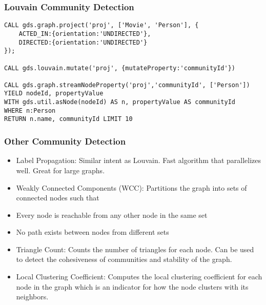 \begin{frame}[fragile]\frametitle{Louvain Community Detection}

\begin{lstlisting}
CALL gds.graph.project('proj', ['Movie', 'Person'], {
    ACTED_IN:{orientation:'UNDIRECTED'},
    DIRECTED:{orientation:'UNDIRECTED'}
});

CALL gds.louvain.mutate('proj', {mutateProperty:'communityId'})

CALL gds.graph.streamNodeProperty('proj','communityId', ['Person'])
YIELD nodeId, propertyValue
WITH gds.util.asNode(nodeId) AS n, propertyValue AS communityId
WHERE n:Person
RETURN n.name, communityId LIMIT 10
\end{lstlisting}

\end{frame}

\begin{frame}[fragile]\frametitle{Other Community Detection}

 
 \begin{itemize}
\item Label Propagation: Similar intent as Louvain. Fast algorithm that parallelizes well. Great for large graphs.
\item Weakly Connected Components (WCC): Partitions the graph into sets of connected nodes such that
\item Every node is reachable from any other node in the same set
\item No path exists between nodes from different sets
\item Triangle Count: Counts the number of triangles for each node. Can be used to detect the cohesiveness of communities and stability of the graph.
\item Local Clustering Coefficient: Computes the local clustering coefficient for each node in the graph which is an indicator for how the node clusters with its neighbors.
\end{itemize}

\end{frame}

